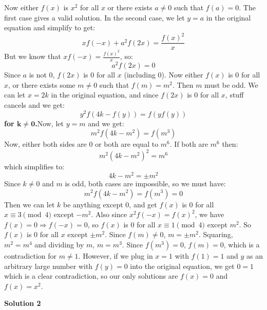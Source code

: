 \begin{enumerate}
 Now either $f(x)$ is $x^2$ for all $x$ or there exists $a \neq 0$ such that $f(a)=0$. The first case gives a valid solution. In the second case, we let $y = a$ in the original equation and simplify to get:
 \[xf(-x) + a^2f(2x) = \frac{f(x)^2}{x}\]But we know that $xf(-x) = \frac{f(x)^2}{x}$, so:
 \[a^2f(2x) = 0\]Since $a$ is not 0, $f(2x)$ is 0 for all $x$ (including 0). Now either $f(x)$ is 0 for all $x$, or there exists some $m \neq 0$ such that $f(m) = m^2$. Then $m$ must be odd. We can let $x = 2k$ in the original equation, and since $f(2x)$ is 0 for all $x$, stuff cancels and we get:
 \[y^2f(4k - f(y)) = f(yf(y))\]\textbf{for $\mathbf{k \neq 0}$.}Now, let $y = m$ and we get:
 \[m^2f(4k - m^2) = f(m^3)\]Now, either both sides are 0 or both are equal to $m^6$. If both are $m^6$ then:
 \[m^2(4k - m^2)^2 = m^6\]which simplifies to:
 \[4k - m^2 = \pm m^2\]Since $k \neq 0$ and $m$ is odd, both cases are impossible, so we must have:
 \[m^2f(4k - m^2) = f(m^3) = 0\]Then we can let $k$ be anything except 0, and get $f(x)$ is 0 for all $x \equiv 3 \pmod{4}$ except $-m^2$.  Also since $x^2f(-x) = f(x)^2$, we have $f(x) = 0 \Rightarrow f(-x) = 0$, so $f(x)$ is 0 for all $x \equiv 1 \pmod{4}$ except $m^2$. So $f(x)$ is 0 for all $x$ except $\pm m^2$. Since $f(m) \neq 0$, $m = \pm m^2$. Squaring, $m^2 = m^4$ and dividing by $m$, $m = m^3$. Since $f(m^3) = 0$, $f(m) = 0$, which is a contradiction for $m \neq 1$. However, if we plug in $x = 1$ with $f(1) = 1$ and $y$ as an arbitrary large number with $f(y) = 0$ into the original equation, we get $0 = 1$ which is a clear contradiction, so our only solutions are $f(x) = 0$ and $f(x) = x^2$.

 



\textbf{Solution 2}


\end{enumerate}
